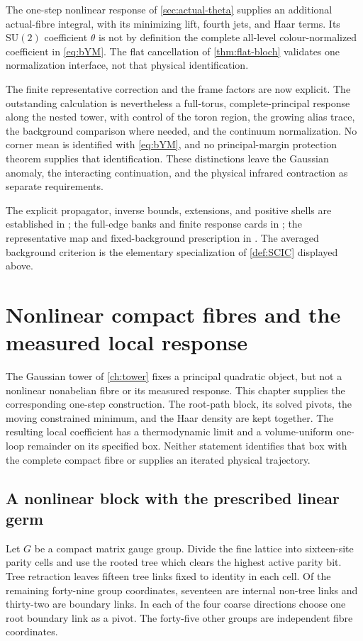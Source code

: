 \documentclass[11pt,oneside,openany]{book}
\theoremstyle{definition}
\theoremstyle{remark}
\newcommand{\SU}{\mathrm{SU}}
\newcommand{\src}[2]{\cite[#2]{#1}}
\newcommand{\sourcebasis}[1]{\par\smallskip\noindent #1\par}
\begin{document}
The one-step nonlinear response of \cref{sec:actual-theta} supplies an
additional actual-fibre integral, with its minimizing lift, fourth jets,
and Haar terms. Its $\SU(2)$ coefficient $\theta$ is not by definition
the complete all-level colour-normalized coefficient in
\cref{eq:bYM}. The flat cancellation of \cref{thm:flat-bloch} validates
one normalization interface, not that physical identification.

The finite representative correction and the frame factors are now
explicit. The outstanding calculation is nevertheless a full-torus,
complete-principal response along the nested tower, with control of the
toron region, the growing alias trace, the background comparison where
needed, and the continuum normalization. No corner mean is identified
with \cref{eq:bYM}, and no principal-margin protection theorem supplies
that identification. These distinctions leave the Gaussian anomaly,
the interacting continuation, and the physical infrared contraction as
separate requirements.
\sourcebasis{The explicit propagator, inverse bounds, extensions, and
positive shells are established in \src{F11}{V37--V38}; the full-edge
banks and finite response cards in \src{F11}{V39}; the representative map
and fixed-background prescription in \src{F11}{V41}. The averaged
background criterion is the elementary specialization of
\cref{def:SCIC} displayed above.}

\chapter{Nonlinear compact fibres and the measured local response}
\label{ch:compact-response}
The Gaussian tower of \cref{ch:tower} fixes a principal quadratic
object, but not a nonlinear nonabelian fibre or its measured response.
This chapter supplies the corresponding one-step construction. The
root-path block, its solved pivots, the moving constrained minimum, and
the Haar density are kept together. The resulting local coefficient has
a thermodynamic limit and a volume-uniform one-loop remainder on its
specified box. Neither statement identifies that box with the complete
compact fibre or supplies an iterated physical trajectory.

\section{A nonlinear block with the prescribed linear germ}
\label{sec:nonlinear-root-block}
Let $G$ be a compact matrix gauge group. Divide the fine lattice into
sixteen-site parity cells and use the rooted tree which clears the
highest active parity bit. Tree retraction leaves fifteen tree links
fixed to identity in each cell. Of the remaining forty-nine group
coordinates, seventeen are internal non-tree links and thirty-two are
boundary links. In each of the four coarse directions choose one root
boundary link as a pivot. The forty-five other groups are independent
fibre coordinates.
\end{document}
